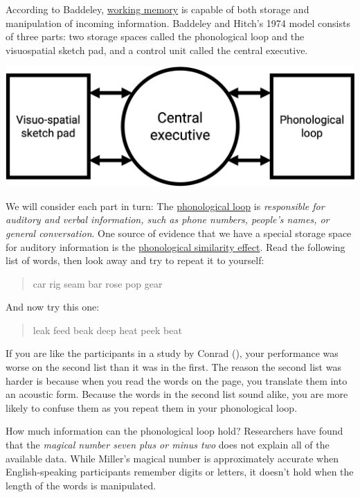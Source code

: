 \documentclass[
]{krantz}
\begin{document}
According to Baddeley, \hyperref[working-memory]{working memory} is capable of both storage and manipulation of incoming information. Baddeley and Hitch's 1974 model consists of three parts: two storage spaces called the phonological loop and the visuospatial sketch pad, and a control unit called the central executive.

\begin{center}\includegraphics[width=0.6\linewidth]{images/ch4/fig2} \end{center}

We will consider each part in turn: The \hyperref[phonological-loop]{phonological loop} is \emph{responsible for auditory and verbal information, such as phone numbers, people's names, or general conversation}. One source of evidence that we have a special storage space for auditory information is the \hyperref[phonological-similarity-effect]{phonological similarity effect}. Read the following list of words, then look away and try to repeat it to yourself:

\begin{quote}
car rig seam bar rose pop gear
\end{quote}

And now try this one:

\begin{quote}
leak feed beak deep heat peek beat
\end{quote}

If you are like the participants in a study by Conrad (), your performance was worse on the second list than it was in the first. The reason the second list was harder is because when you read the words on the page, you translate them into an acoustic form. Because the words in the second list sound alike, you are more likely to confuse them as you repeat them in your phonological loop.

How much information can the phonological loop hold? Researchers have found that the \emph{magical number seven plus or minus two} does not explain all of the available data. While Miller's magical number is approximately accurate when English-speaking participants remember digits or letters, it doesn't hold when the length of the words is manipulated.
\end{document}
